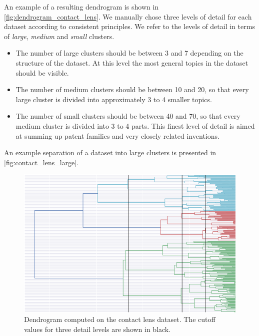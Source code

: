 An example of a resulting dendrogram is shown in \autoref{fig:dendrogram_contact_lens}.
We manually chose three levels of detail for each dataset according to consistent principles.
We refer to the levels of detail in terms of \textit{large}, \textit{medium} and \textit{small} clusters.
\begin{itemize}
\item The number of large clusters should be between 3 and 7 depending on the structure of the dataset. 
At this level the most general topics in the dataset should be visible.
\item The number of medium clusters should be between 10 and 20, so that every large cluster is divided into approximately 3 to 4 smaller topics.
\item The number of small clusters should be between 40 and 70, so that every medium cluster is divided into 3 to 4 parts.
This finest level of detail is aimed at summing up patent families and very closely related inventions.
\end{itemize}
An example separation of a dataset into large clusters is presented in \autoref{fig:contact_lens_large}.

\begin{figure}[!]
\centering
\includegraphics[width=\textwidth]{img/dendrogram_contact_lens}
\caption{Dendrogram computed on the contact lens dataset. The cutoff values for three detail levels are shown in black.}
\label{fig:dendrogram_contact_lens}
\end{figure}

